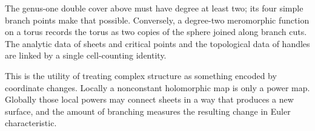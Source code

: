 The genus-one double cover above must have degree at least two; its four simple branch points make that possible. Conversely, a degree-two meromorphic function on a torus records the torus as two copies of the sphere joined along branch cuts. The analytic data of sheets and critical points and the topological data of handles are linked by a single cell-counting identity.

This is the utility of treating complex structure as something encoded by coordinate changes. Locally a nonconstant holomorphic map is only a power map. Globally those local powers may connect sheets in a way that produces a new surface, and the amount of branching measures the resulting change in Euler characteristic.
